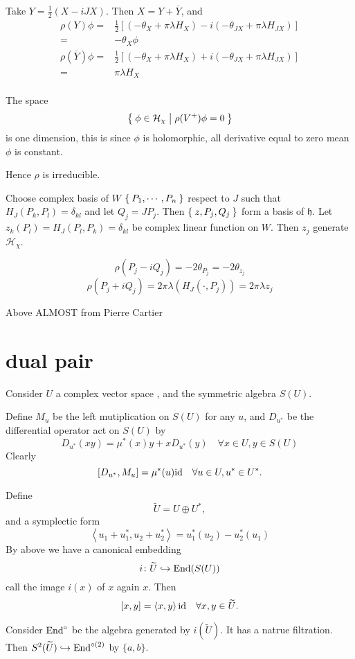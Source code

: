 \documentclass[12pt]{amsart}
\def\End{{\rm End}}
\def\id{{\rm id}}
\def\inn#1#2{\left\langle{#1},{#2}\right\rangle}
\def\fhh{\mathfrak{h}}
\def\chh{\mathcal{H}}
\def\tU{{\widetilde{U}}}
\begin{document}
Take $Y = \frac{1}{2}(X-iJX)$. Then $X = Y + \overline{Y}$, 
and 
\[
\begin{split}
\rho(Y) \phi =& \frac{1}{2}[(-\theta_X + \pi \lambda H_X) 
-i(-\theta_{JX}+\pi\lambda H_{JX})]\\
=& -\theta_X \phi 
\end{split}
\]
\[
\begin{split}
\rho(\overline{Y}) \phi =& \frac{1}{2}[(-\theta_X + \pi \lambda H_X) 
+i(-\theta_{JX}+\pi\lambda H_{JX})]\\
=& \pi\lambda H_X \\
\end{split}
\]

The space 
\[
\Set{\phi \in \chh_\chi |\rho(V^+) \phi = 0}
\]
is one dimension, this is since $\phi$ is holomorphic, 
all derivative equal to zero mean $\phi$ is constant. 

Hence $\rho$ is irreducible. 

Choose complex basis of $W$ $\Set{P_1, \cdots, P_n}$
respect to $J$ such that
$H_J(P_k, P_l) = \delta_{kl}$ and let $Q_j = J P_j$. 
Then $\Set{z, P_j, Q_j}$ form a basis of $\fhh$. 
Let $z_k(P_l) = H_J(P_l, P_k) =\delta_{kl}$ be complex linear function on 
$W$. Then $z_j$ generate $\chh_\chi$. 

\[
\rho(P_j-iQ_j) = -2 \theta_{P_j} =  -2\theta_{z_j}
\]
\[
\rho(P_j+iQ_j) = 2\pi\lambda (H_J(\cdot,P_j)) 
 = 2\pi \lambda z_j
\]

Above ALMOST from Pierre Cartier 


\section{dual pair}

Consider $U$ a complex vector space , and the symmetric algebra $S(U)$.

Define $M_u$ be the left mutiplication on $S(U)$ for any $u$, 
and $D_{u^*}$ be the differential operator act on $S(U)$ by
\[
D_{u^*}(xy) = \mu^*(x) y + xD_{u^*}(y) \quad \forall x\in U, y\in S(U)
\]
Clearly
\[
[D_{u^*}, M_u] = \mu^*(u) \id \quad \forall u\in U, u^*\in U^*.
\]

Define 
\[
\tU = U\oplus U^*, 
\]
and a symplectic form 
\[
\inn{u_1+u_1^*}{u_2+u_2^*} = u_1^*(u_2) - u_2^*(u_1)
\]
By above we have a canonical embedding 
\[
i\colon \tU \hookrightarrow \End(S(U))   
\]
call the image $i(x)$ of $x$ again $x$. 
Then 
\[
[x,y] = \inn{x}{y} \id \quad \forall x,y \in \tU.
\]

Consider 
$\End^\circ$ be the algebra generated by $i(\tU)$. It has a natrue filtration.
Then $S^2(\tU) \hookrightarrow \End^{\circ (2)}$ by $\{a,b\}$.
\end{document}
